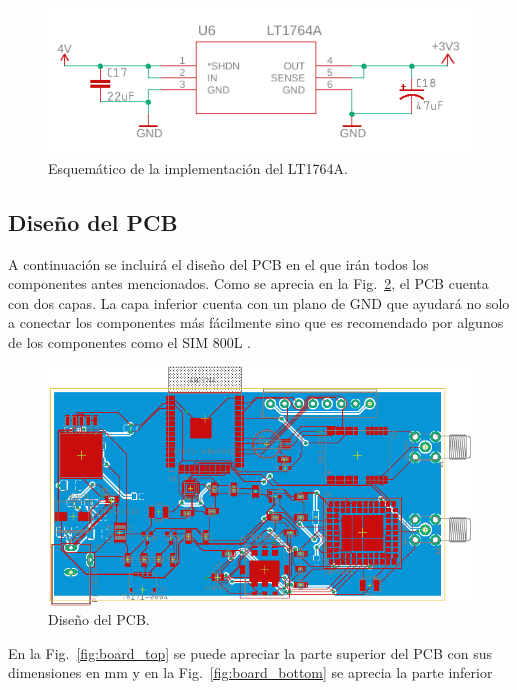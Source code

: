 \begin{figure}[hbtp!]
\centering
\includegraphics[width=\textwidth]{LDO.pdf}
\caption{Esquemático de la implementación del LT1764A.}
\label{fig:LDO}
\end{figure}









\subsection{Diseño del PCB}
A continuación se incluirá el diseño del PCB en el que irán todos los componentes antes mencionados. Como se aprecia en la Fig.~\ref{fig:Board}, el PCB cuenta con dos capas. La capa inferior cuenta con un plano de GND que ayudará no solo a conectar los componentes más fácilmente sino que es recomendado por algunos de los componentes como el SIM 800L \cite{SIM800L}.

\begin{figure}[hbtp!]
\centering
\includegraphics[width=\textwidth]{Board.pdf}
\caption{Diseño del PCB.}
\label{fig:Board}
\end{figure}


En la Fig.~\ref{fig:board_top} se puede apreciar la parte superior del PCB con sus dimensiones en mm y en la Fig.~\ref{fig:board_bottom} se aprecia la parte inferior

